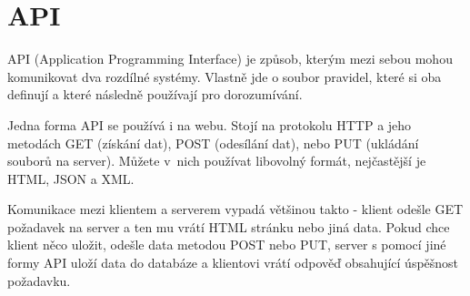 \section{API}

API (Application Programming Interface) je způsob, kterým mezi sebou mohou komunikovat dva rozdílné systémy. Vlastně jde o soubor pravidel, které si oba definují a které následně používají pro dorozumívání.\cite{WhatIsAPI}

Jedna forma API se používá i na webu. Stojí na protokolu HTTP a jeho metodách GET (získání dat), POST (odesílání dat), nebo PUT (ukládání souborů na server). Můžete v~nich používat libovolný formát, nejčastější je HTML, JSON a XML.

Komunikace mezi klientem a serverem vypadá většinou takto - klient odešle GET požadavek na server a ten mu vrátí HTML stránku nebo jiná data. Pokud chce klient něco uložit, odešle data metodou POST nebo PUT, server s pomocí jiné formy API uloží data do databáze a klientovi vrátí odpověď obsahující úspěšnost požadavku.